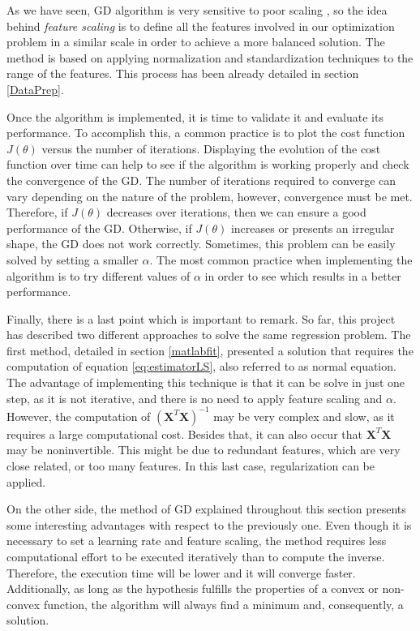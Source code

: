 \documentclass[a4paper, report, oneside, UKenglish]{memoir}
\newcommand{\bX}{\boldsymbol{X}}
\begin{document}
As we have seen, GD algorithm is very sensitive to poor scaling \cite{numericalopt}, so the idea behind \textit{feature scaling} is to define all the features involved in our optimization problem in a similar scale in order to achieve a more balanced solution. The method is based on applying normalization and standardization techniques to the range of the features. This process has been already detailed in section \ref{DataPrep}. 

Once the algorithm is implemented, it is time to validate it and evaluate its performance. To accomplish this, a common practice is to plot the cost function $J(\theta)$ versus the number of iterations. Displaying the evolution of the cost function over time can help to see if the algorithm is working properly and check the convergence of the GD. The number of iterations required to converge can vary depending on the nature of the problem, however, convergence must be met. Therefore, if $J(\theta)$ decreases over iterations, then we can ensure a good performance of the GD. Otherwise, if $J(\theta)$ increases or presents an irregular shape, the GD does not work correctly. Sometimes, this problem can be easily solved by setting a smaller $\alpha$. The most common practice when implementing the algorithm is to try different values of $\alpha$ in order to see which results in a better performance. 

Finally, there is a last point which is important to remark. So far, this project has described two different approaches to solve the same regression problem. The first method, detailed in section \ref{matlabfit}, presented a solution that requires the computation of equation \eqref{eq:estimatorLS}, also referred to as normal equation. The advantage of implementing this technique is that it can be solve in just one step, as it is not iterative, and there is no need to apply feature scaling and $\alpha$. However, the computation of $(\bX^{T}\bX)^{-1}$ may be very complex and slow, as it requires a large computational cost. Besides that, it can also occur that $\bX^{T}\bX$ may be noninvertible. This might be due to redundant features, which are very close related, or too many features. In this last case, regularization can be applied. 

On the other side, the method of GD explained throughout this section presents some interesting advantages with respect to the previously one. Even though it is necessary to set a learning rate and feature scaling, the method requires less computational effort to be executed iteratively than to compute the inverse. Therefore, the execution time will be lower and it will converge faster. Additionally, as long as the hypothesis fulfills the properties of a convex or non-convex function, the algorithm will always find a minimum and, consequently, a solution. 
\end{document}
